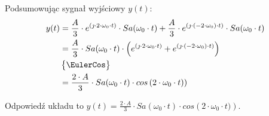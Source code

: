 \begin{task}
Podsumowując sygnał wyjściowy $y(t)$:
\begin{align*}
y(t) &= \frac{A}{3} \cdot e^{(\jmath \cdot 2 \cdot \omega_0 \cdot t)} \cdot Sa(\omega_0 \cdot t) + \frac{A}{3} \cdot e^{(\jmath \cdot (-2 \cdot \omega_0) \cdot t)} \cdot Sa(\omega_0 \cdot t)\\
&= \frac{A}{3} \cdot Sa(\omega_0 \cdot t) \cdot \left(e^{(\jmath \cdot 2 \cdot \omega_0 \cdot t)} + e^{(\jmath \cdot (-2 \cdot \omega_0) \cdot t)} \right)\\
&\begin{Bmatrix}
\EulerCos
\end{Bmatrix}\\
&= \frac{2 \cdot A}{3} \cdot Sa(\omega_0 \cdot t) \cdot cos\left(2 \cdot \omega_0 \cdot t)\right)\\
\end{align*}

Odpowied\'{z} układu to $y(t)= \frac{2 \cdot A}{3} \cdot Sa(\omega_0 \cdot t) \cdot cos\left(2 \cdot \omega_0 \cdot t)\right)$.
\end{task}

